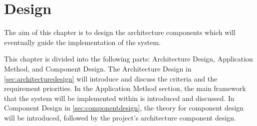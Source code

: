 \chapter{Design}\label{ch:design}
The aim of this chapter is to design the architecture components which will eventually guide the implementation of the system.

This chapter is divided into the following parts: Architecture Design, Application Method, and Component Design.
The Architecture Design in \cref{sec:architecturedesign} will introduce and discuss the criteria and the requirement priorities.
In the Application Method section, the main framework that the system will be implemented within is introduced and discussed.
In Component Design in \cref{sec:componentdesign}, the theory for component design will be introduced, followed by the project's architecture component design.





